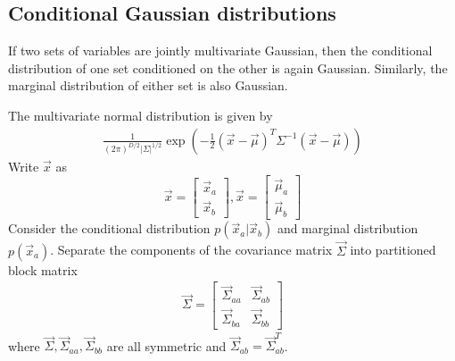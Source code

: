 \subsection{Conditional Gaussian distributions}
\begin{theorem}
If two sets of variables are jointly multivariate Gaussian, then the conditional distribution of one set conditioned on the other is again Gaussian. Similarly, the marginal distribution of either set is also Gaussian.
\end{theorem}
The multivariate normal distribution is given by
\begin{align}
\frac{1}{(2\pi)^{D/2}|\Sigma|^{1/2}} \exp\left(-\frac{1}{2} (\vec{x}-\vec{\mu})^T \Sigma^{-1} (\vec{x}-\vec{\mu})\right)
\end{align}
Write $\vec{x}$ as
\begin{equation}
\vec{x} = \left[ \begin{array}{c} \vec{x}_a\\ \vec{x}_b \end{array} \right],
\vec{x} = \left[ \begin{array}{c} \vec{\mu}_a\\ \vec{\mu}_b \end{array} \right]
\end{equation}
Consider the conditional distribution $p(\vec{x}_a|\vec{x}_b)$ and marginal distribution $p(\vec{x}_a)$.
Separate the components of the covariance matrix $\vec{\Sigma}$ into partitioned block matrix
\begin{align}
\vec{\Sigma} = \left[ \begin{array}{cc} \vec{\Sigma}_{aa} & \vec{\Sigma}_{ab} \\ \vec{\Sigma}_{ba} & \vec{\Sigma}_{bb} \end{array}\right]
\end{align}
where $\vec{\Sigma},\vec{\Sigma}_{aa},\vec{\Sigma}_{bb}$ are all symmetric and $\vec{\Sigma}_{ab} = \vec{\Sigma}_{ab}^T$.

